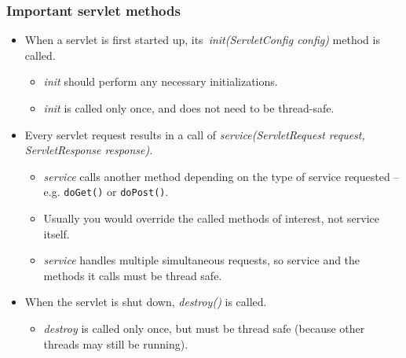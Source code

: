 \documentclass[10pt,xcolor=pdflatex]{beamer}
\begin{document}
    
\begin{frame}[fragile]\frametitle{Important servlet methods}  
	\begin{itemize}
    	\item When a servlet is first started up, its~\emph{init(ServletConfig config)} method is called.
		  \begin{itemize}
        	\item \emph{init} should perform any necessary initializations.
			\item \emph{init} is called only once, and does not need to be thread-safe.
          \end{itemize}
        \item Every servlet request results in a call of \emph{service(ServletRequest request, ServletResponse response)}.
          \begin{itemize}
        	\item \emph{service} calls another method depending on the type of service requested -- e.g. \texttt{doGet()} or \texttt{doPost()}.
			\item Usually you would override the called methods of interest, not service itself.
			\item \emph{service} handles multiple simultaneous requests, so service and the methods it calls must be thread safe.
          \end{itemize}
        \item When the servlet is shut down, \emph{destroy()} is called.
          \begin{itemize}
        	\item \emph{destroy} is called only once, but must be thread safe (because other threads may still be running).
          \end{itemize}
    \end{itemize}
\end{frame}
\end{document}
